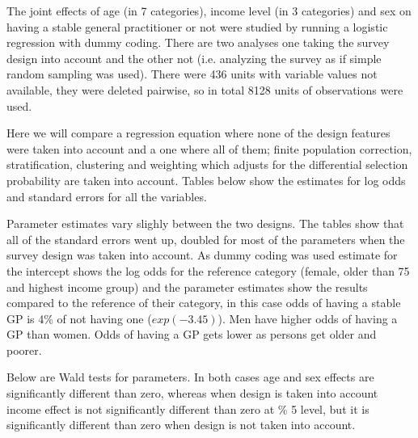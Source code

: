 The joint effects of age (in 7 categories), income level (in 3 categories) and sex on having a stable general practitioner or not were studied by running a logistic regression with dummy coding. There are two analyses one taking the survey design into account and the other not (i.e. analyzing the survey as if simple random sampling was used). There were 436 units with variable values not available, they were deleted pairwise, so in total 8128 units of observations were used.

Here we will compare a regression equation where none of the design features were taken into account and a one where all of them; finite population correction, stratification, clustering and weighting which adjusts for the differential selection probability are taken into account. Tables below show the estimates for log odds and standard errors for all the variables.





Parameter estimates vary slighly between the two designs. The tables show that all of the standard errors went up, doubled for most of the parameters when the survey design was taken into account. As dummy coding was used estimate for the intercept shows the log odds for the reference category (female, older than 75 and highest income group) and the parameter estimates show the results compared to the reference of their category, in this case odds of having a stable GP is 4\% of not having one ($exp(-3.45)$). Men have higher odds of having a GP than women. Odds of having a GP gets lower as persons get older and poorer.

Below are Wald tests for parameters. In both cases age and sex effects are significantly different than zero, whereas when design is taken into account income effect is not significantly different than zero at \% 5 level, but it is significantly different than zero when design is not taken into account. 



